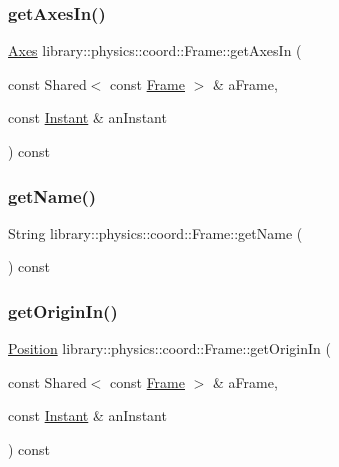 \mbox{\label{classlibrary_1_1physics_1_1coord_1_1_frame_abd6fc9109e37433d4b223cfb291edb20}} 
\subsubsection{\texorpdfstring{get\+Axes\+In()}{getAxesIn()}}
{\footnotesize\ttfamily \hyperlink{classlibrary_1_1physics_1_1coord_1_1_axes}{Axes} library\+::physics\+::coord\+::\+Frame\+::get\+Axes\+In (\begin{DoxyParamCaption}\item[{const Shared$<$ const \hyperlink{classlibrary_1_1physics_1_1coord_1_1_frame}{Frame} $>$ \&}]{a\+Frame,  }\item[{const \hyperlink{classlibrary_1_1physics_1_1time_1_1_instant}{Instant} \&}]{an\+Instant }\end{DoxyParamCaption}) const}

\mbox{\label{classlibrary_1_1physics_1_1coord_1_1_frame_afec582db83d2bf93b2b070f8557ee760}} 
\subsubsection{\texorpdfstring{get\+Name()}{getName()}}
{\footnotesize\ttfamily String library\+::physics\+::coord\+::\+Frame\+::get\+Name (\begin{DoxyParamCaption}{ }\end{DoxyParamCaption}) const}

\mbox{\label{classlibrary_1_1physics_1_1coord_1_1_frame_aa68223b40939d6dd45ace7746805d33c}} 
\subsubsection{\texorpdfstring{get\+Origin\+In()}{getOriginIn()}}
{\footnotesize\ttfamily \hyperlink{classlibrary_1_1physics_1_1coord_1_1_position}{Position} library\+::physics\+::coord\+::\+Frame\+::get\+Origin\+In (\begin{DoxyParamCaption}\item[{const Shared$<$ const \hyperlink{classlibrary_1_1physics_1_1coord_1_1_frame}{Frame} $>$ \&}]{a\+Frame,  }\item[{const \hyperlink{classlibrary_1_1physics_1_1time_1_1_instant}{Instant} \&}]{an\+Instant }\end{DoxyParamCaption}) const}

